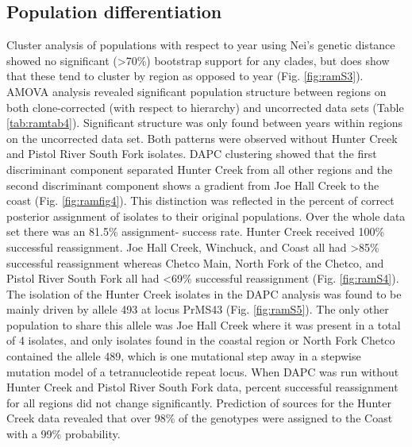 \documentclass[double,11pt]{beavtex}
\begin{document}
  \subsection{Population
  differentiation}\label{population-differentiation}
  
  Cluster analysis of populations with respect to year using Nei's genetic
  distance showed no significant (\textgreater{}70\%) bootstrap support
  for any clades, but does show that these tend to cluster by region as
  opposed to year (Fig. \ref{fig:ramS3}). AMOVA analysis revealed
  significant population structure between regions on both clone-corrected
  (with respect to hierarchy) and uncorrected data sets (Table
  \ref{tab:ramtab4}). Significant structure was only found between years
  within regions on the uncorrected data set. Both patterns were observed
  without Hunter Creek and Pistol River South Fork isolates. DAPC
  clustering showed that the first discriminant component separated Hunter
  Creek from all other regions and the second discriminant component shows
  a gradient from Joe Hall Creek to the coast (Fig. \ref{fig:ramfig4}).
  This distinction was reflected in the percent of correct posterior
  assignment of isolates to their original populations. Over the whole
  data set there was an 81.5\% assignment- success rate. Hunter Creek
  received 100\% successful reassignment. Joe Hall Creek, Winchuck, and
  Coast all had \textgreater{}85\% successful reassignment whereas Chetco
  Main, North Fork of the Chetco, and Pistol River South Fork all had
  \textless{}69\% successful reassignment (Fig. \ref{fig:ramS4}). The
  isolation of the Hunter Creek isolates in the DAPC analysis was found to
  be mainly driven by allele 493 at locus PrMS43 (Fig. \ref{fig:ramS5}).
  The only other population to share this allele was Joe Hall Creek where
  it was present in a total of 4 isolates, and only isolates found in the
  coastal region or North Fork Chetco contained the allele 489, which is
  one mutational step away in a stepwise mutation model of a
  tetranucleotide repeat locus. When DAPC was run without Hunter Creek and
  Pistol River South Fork data, percent successful reassignment for all
  regions did not change significantly. Prediction of sources for the
  Hunter Creek data revealed that over 98\% of the genotypes were assigned
  to the Coast with a 99\% probability.
  
\end{document}

